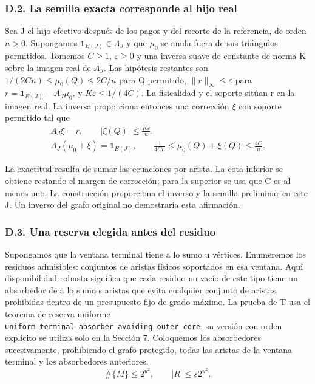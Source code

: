 \documentclass[spanish,11pt,a4paper]{article}
\begin{document}
\subsubsection{D.2. La semilla exacta corresponde al hijo real}\label{d.2.-la-semilla-exacta-corresponde-al-hijo-real}

Sea J el hijo efectivo después de los pagos y del recorte de la referencia, de orden \(n>0\). Supongamos \(\mathbf1_{E(J)}\in\Lambda_J\) y que \(\mu_0\) se anula fuera de sus triángulos permitidos. Tomemos \(C\geq1\), \(\varepsilon\geq0\) y una inversa suave de constante de norma K sobre la imagen real de \(A_J\). Las hipótesis restantes son \(1/(2Cn)\leq\mu_0(Q)\leq2C/n\) para Q permitido, \(\|r\|_\infty\leq\varepsilon\) para \(r=\mathbf1_{E(J)}-A_J\mu_0\), y \(K\varepsilon\leq1/(4C)\). La fisicalidad y el soporte sitúan r en la imagen real. La inversa proporciona entonces una corrección \(\xi\) con soporte permitido tal que
\[\begin{gathered}A_J\xi=r,\qquad |\xi(Q)|\leq\frac{K\varepsilon}{n},\\
A_J(\mu_0+\xi)=\mathbf1_{E(J)},\qquad \frac1{4Cn}\leq\mu_0(Q)+\xi(Q)\leq\frac{4C}{n}.\end{gathered}\tag{D.5}\]

La exactitud resulta de sumar las ecuaciones por arista. La cota inferior se obtiene restando el margen de corrección; para la superior se usa que C es al menos uno. La construcción proporciona el inverso y la semilla preliminar en este J. Un inverso del grafo original no demostraría esta afirmación.

\subsubsection{D.3. Una reserva elegida antes del residuo}\label{d.3.-una-reserva-elegida-antes-del-residuo}

Supongamos que la ventana terminal tiene a lo sumo u vértices. Enumeremos los residuos admisibles: conjuntos de aristas físicos soportados en esa ventana. Aquí disponibilidad robusta significa que cada residuo no vacío de este tipo tiene un absorbedor de a lo sumo s aristas que evita cualquier conjunto de aristas prohibidas dentro de un presupuesto fijo de grado máximo. La prueba de T usa el teorema de reserva uniforme \texttt{uniform\_\allowbreak{}terminal\_\allowbreak{}absorber\_\allowbreak{}avoiding\_\allowbreak{}outer\_\allowbreak{}core}; su versión con orden explícito se utiliza solo en la Sección 7. Coloquemos los absorbedores sucesivamente, prohibiendo el grafo protegido, todas las aristas de la ventana terminal y los absorbedores anteriores.
\[\#\{M\}\leq2^{u^2},\qquad |R|\leq s2^{u^2}. \tag{D.6}\]
\end{document}
